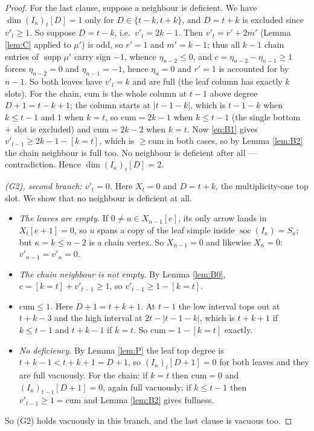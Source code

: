 \documentclass[reqno]{amsart}
\theoremstyle{plain}
\theoremstyle{definition}
\DeclareMathOperator{\soc}{soc}
\newcommand{\ka}{\kappa}
\begin{document}
\begin{proof}
For the last clause, suppose a neighbour is deficient.  We have
$\dim(I_\ka)_t[D]=1$ only for $D\in\{t-k,t+k\}$, and $D=t+k$ is excluded since
$v'_t\ge1$.  So suppose $D=t-k$, i.e.\ $v'_t=2k-1$.  Then
$v'_t=r'+2m'$ (Lemma \ref{lem:C} applied to $\mu'$) is odd, so $r'=1$ and
$m'=k-1$; thus all $k-1$ chain entries of $\operatorname{supp}\mu'$ carry sign
$-1$, whence $\eta_{n-2}\le0$, and $c=\eta_{n-2}-\eta_{n-1}\ge1$ forces
$\eta_{n-2}=0$ and $\eta_{n-1}=-1$, hence $\eta_n=0$ and $r'=1$ is accounted
for by $n-1$.  So both leaves have $v'_l=k$ and are full (the leaf column has
exactly $k$ slots).  For the chain, $\mathrm{cum}$ is the whole column at $t-1$
above degree $D+1=t-k+1$; the column starts at $|t-1-k|$, which is $t-1-k$ when
$k\le t-1$ and $1$ when $k=t$, so $\mathrm{cum}=2k-1$ when $k\le t-1$ (the
single bottom $+$ slot is excluded) and $\mathrm{cum}=2k-2$ when $k=t$.  Now
\eqref{eq:B1} gives $v'_{t-1}\ge 2k-1-[k=t]$, which is $\ge\mathrm{cum}$ in
both cases, so by Lemma \ref{lem:B2} the chain neighbour is full too.  No
neighbour is deficient after all --- contradiction.  Hence
$\dim(I_\ka)_t[D]=2$.

\smallskip\noindent\emph{(G2), second branch: $v'_t=0$.}
Here $X_t=0$ and $D=t+k$, the multiplicity-one top slot.  We show that no
neighbour is deficient at all.
\begin{itemize}\itemsep1pt
\item \emph{The leaves are empty.}  If $0\ne u\in X_{n-1}[e]$, its only arrow
lands in $X_t[e+1]=0$, so $u$ spans a copy of the leaf simple inside
$\soc(I_\ka)=S_\ka$; but $\ka=k\le n-2$ is a chain vertex.  So $X_{n-1}=0$ and
likewise $X_n=0$: $v'_{n-1}=v'_n=0$.
\item \emph{The chain neighbour is not empty.}  By Lemma \ref{lem:B0},
$c=[k=t]+v'_{t-1}\ge1$, so $v'_{t-1}\ge1-[k=t]$.
\item \emph{$\mathrm{cum}\le1$.}  Here $D+1=t+k+1$.  At $t-1$ the low interval
tops out at $t+k-3$ and the high interval at $2t-|t-1-k|$, which is $t+k+1$ if
$k\le t-1$ and $t+k-1$ if $k=t$.  So $\mathrm{cum}=1-[k=t]$ exactly.
\item \emph{No deficiency.}  By Lemma \ref{lem:P} the leaf top degree is
$t+k-1<t+k+1=D+1$, so $(I_\ka)_l[D+1]=0$ for both leaves and they are full
vacuously.  For the chain: if $k=t$ then $\mathrm{cum}=0$ and
$(I_\ka)_{t-1}[D+1]=0$, again full vacuously; if $k\le t-1$ then
$v'_{t-1}\ge1=\mathrm{cum}$ and Lemma \ref{lem:B2} gives fullness.
\end{itemize}
So (G2) holds vacuously in this branch, and the last clause is vacuous too.
\end{proof}
\end{document}
